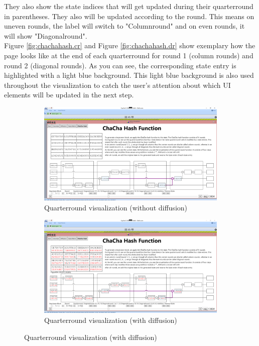 They also show the state indices that will get updated during their quarterround in parentheses. They also will be updated according to the round. This means on uneven rounds, the label will switch to "Columnround" and on even rounds, it will show "Diagonalround". \\
Figure \ref{fig:chachahash.cr} and Figure \ref{fig:chachahash.dr} show exemplary how the page looks like at the end of each quarterround for round 1 (column rounds) and round 2 (diagonal rounds). As you can see, the corresponding state entry is highlighted with a light blue background. This light blue background is also used throughout the visualization to catch the user's attention about which UI elements will be updated in the next step.\\

\begin{figure}
\caption{Quarterround visualization during ChaCha hash function}
\label{fig:chachahash.mid.qr}
\centering
\begin{subfigure}{\textwidth}
  \centering
  \includegraphics[width=\textwidth]{figures/ct2/chachahash/chachahash-mid-qr.png}
  \caption{Quarterround visualization (without diffusion)}
  \label{fig:chachahash.mid.qr.without.diffusion}
\end{subfigure}
\begin{subfigure}{\textwidth}
  \centering
  \includegraphics[width=\textwidth]{figures/ct2/chachahash/chachahash-mid-qr-diffusion.png}
  \caption{Quarterround visualization (with diffusion)}
  \label{fig:chachahash.mid.qr.with.diffusion}
\end{subfigure}
\end{figure}


